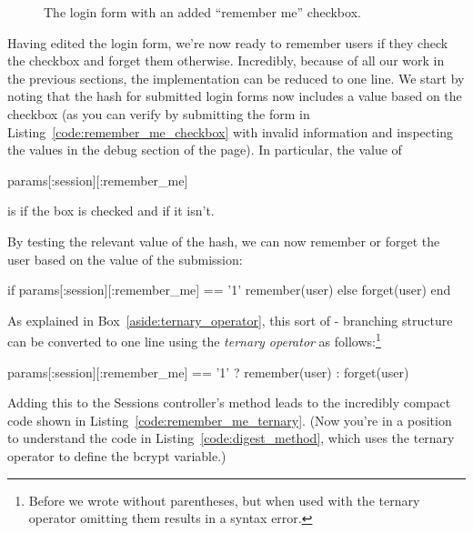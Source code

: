 \begin{figure}
\begin{center}
\end{center}
\caption{The login form with an added ``remember me'' checkbox.\label{fig:login_form_remember_me}}
\end{figure}

Having edited the login form, we're now ready to remember users if they check the checkbox and forget them otherwise. Incredibly, because of all our work in the previous sections, the implementation can be reduced to one line. We start by noting that the  hash for submitted login forms now includes a value based on the checkbox (as you can verify by submitting the form in Listing~\ref{code:remember_me_checkbox} with invalid information and inspecting the values in the debug section of the page). In particular, the value of

\begin{code}
params[:session][:remember_me]
\end{code}

\noindent is  if the box is checked and  if it isn't.

By testing the relevant value of the  hash, we can now remember or forget the user based on the value of the submission:

\begin{code}
if params[:session][:remember_me] == '1'
  remember(user)
else
  forget(user)
end
\end{code}

\noindent As explained in Box~\ref{aside:ternary_operator}, this sort of - branching structure can be converted to one line using the \emph{ternary operator} as follows:\footnote{Before we wrote  without parentheses, but when used with the ternary operator omitting them results in a syntax error.}

\begin{code}
params[:session][:remember_me] == '1' ? remember(user) : forget(user)
\end{code}

\noindent Adding this to the Sessions controller's  method leads to the incredibly compact code shown in Listing~\ref{code:remember_me_ternary}. (Now you're in a position to understand the code in Listing~\ref{code:digest_method}, which uses the ternary operator to define the bcrypt  variable.)

